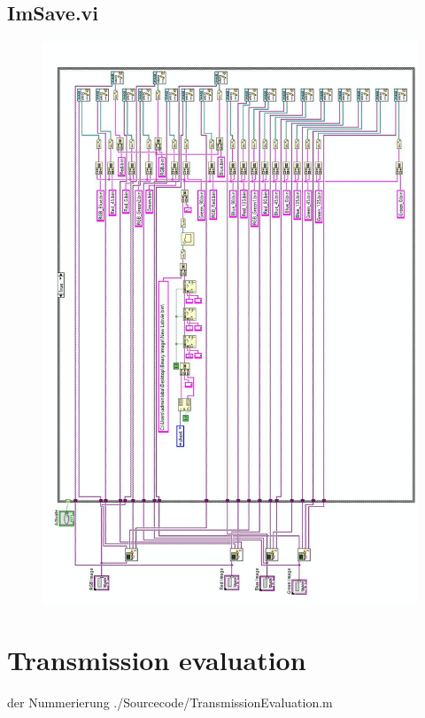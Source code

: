 \subsection{ImSave.vi}
\begin{figure}[h]
\begin{center}
\includegraphics[width=13cm]{Pictures/AppSaveDatavi}
\end{center}
\end{figure}

\newpage
\section{Transmission evaluation}
%
 der Nummerierung 
		{./Sourcecode/TransmissionEvaluation.m} %
		

